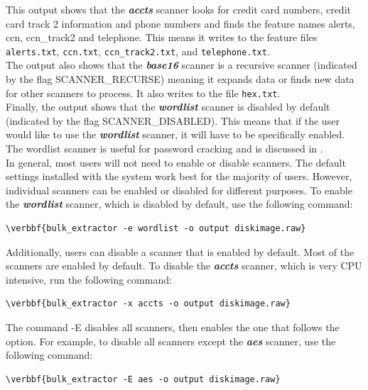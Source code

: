 \documentclass[11pt]{article} %
\begin{document}
This output shows that the  \textbf{\textit{accts}} scanner looks for credit card numbers, credit card track 2 information and phone numbers and finds the feature names alerts, ccn, ccn\_track2 and telephone. This means it writes to the feature files \texttt{alerts.txt}, \texttt{ccn.txt}, \texttt{ccn\_track2.txt}, and \texttt{telephone.txt}.\\

The output also shows that the  \textbf{\textit{base16}} scanner is a recursive scanner (indicated by the flag SCANNER\_RECURSE) meaning it expands data or finds new data for other scanners to process. It also writes to the file \texttt{hex.txt}.\\

Finally, the output shows that the  \textbf{\textit{wordlist}} scanner is disabled by default (indicated by the flag SCANNER\_DISABLED). This means that if the user would like to use the  \textbf{\textit{wordlist}} scanner, it will have to be specifically enabled. The wordlist scanner is useful for password cracking and is discussed in \textbf{}. \\

In general, most users will not need to enable or disable scanners. The default settings installed with the \bulk system work best for the majority of users. However, individual scanners can be enabled or disabled for different purposes. To enable the  \textbf{\textit{wordlist}} scanner, which is disabled by default, use the following command:
\begin{Verbatim}[commandchars=\\\{\}]
\verbbf{bulk_extractor -e wordlist -o output diskimage.raw}
\end{Verbatim} 

Additionally, users can disable a scanner that is enabled by default. Most of the scanners are enabled by default. To disable the  \textbf{\textit{accts}} scanner, which is very CPU intensive, run the following command:
\begin{Verbatim}[commandchars=\\\{\}]
\verbbf{bulk_extractor -x accts -o output diskimage.raw} 
\end{Verbatim}

The command -E disables all scanners, then enables the one that follows the option. For example, to disable all scanners except the \textbf{\textit{aes}} scanner, use the following command:
\begin{Verbatim}[commandchars=\\\{\}]
\verbbf{bulk_extractor -E aes -o output diskimage.raw}
\end{Verbatim} 
\end{document}
